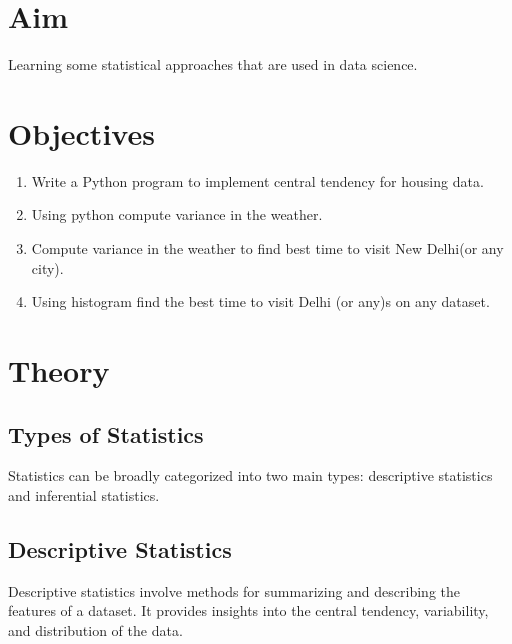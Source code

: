\documentclass[11pt]{article}
\begin{document}
\tableofcontents
\thispagestyle{empty}
\clearpage

\setcounter{page}{1}

\section{Aim}
Learning some statistical approaches that are used in data science.

\section{Objectives}
\begin{enumerate}
    \item Write a Python program to implement central tendency for housing data.
    \item Using python compute variance in the weather.
    \item Compute variance in the weather to find best time to visit New Delhi(or any city).
    \item Using histogram find the best time to visit Delhi (or any)s on any dataset.
\end{enumerate}

\section{Theory}

\subsection{Types of Statistics}
Statistics can be broadly categorized into two main types: descriptive statistics and inferential statistics.

\subsection{Descriptive Statistics}
Descriptive statistics involve methods for summarizing and describing the features of a dataset. It provides insights into the central tendency, variability, and distribution of the data.
\end{document}
